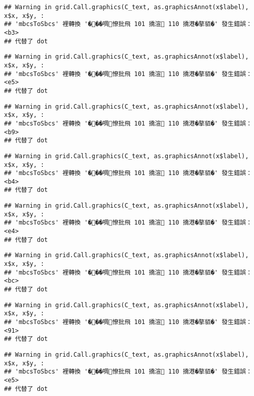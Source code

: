 \documentclass[
]{article}
\begin{document}
\begin{verbatim}
## Warning in grid.Call.graphics(C_text, as.graphicsAnnot(x$label), x$x, x$y, :
## 'mbcsToSbcs' 裡轉換 '���啁憭批飛 101 撟渲 110 撟港�摮貊�' 發生錯誤：<b3>
## 代替了 dot
\end{verbatim}

\begin{verbatim}
## Warning in grid.Call.graphics(C_text, as.graphicsAnnot(x$label), x$x, x$y, :
## 'mbcsToSbcs' 裡轉換 '���啁憭批飛 101 撟渲 110 撟港�摮貊�' 發生錯誤：<e5>
## 代替了 dot
\end{verbatim}

\begin{verbatim}
## Warning in grid.Call.graphics(C_text, as.graphicsAnnot(x$label), x$x, x$y, :
## 'mbcsToSbcs' 裡轉換 '���啁憭批飛 101 撟渲 110 撟港�摮貊�' 發生錯誤：<b9>
## 代替了 dot
\end{verbatim}

\begin{verbatim}
## Warning in grid.Call.graphics(C_text, as.graphicsAnnot(x$label), x$x, x$y, :
## 'mbcsToSbcs' 裡轉換 '���啁憭批飛 101 撟渲 110 撟港�摮貊�' 發生錯誤：<b4>
## 代替了 dot
\end{verbatim}

\begin{verbatim}
## Warning in grid.Call.graphics(C_text, as.graphicsAnnot(x$label), x$x, x$y, :
## 'mbcsToSbcs' 裡轉換 '���啁憭批飛 101 撟渲 110 撟港�摮貊�' 發生錯誤：<e4>
## 代替了 dot
\end{verbatim}

\begin{verbatim}
## Warning in grid.Call.graphics(C_text, as.graphicsAnnot(x$label), x$x, x$y, :
## 'mbcsToSbcs' 裡轉換 '���啁憭批飛 101 撟渲 110 撟港�摮貊�' 發生錯誤：<bc>
## 代替了 dot
\end{verbatim}

\begin{verbatim}
## Warning in grid.Call.graphics(C_text, as.graphicsAnnot(x$label), x$x, x$y, :
## 'mbcsToSbcs' 裡轉換 '���啁憭批飛 101 撟渲 110 撟港�摮貊�' 發生錯誤：<91>
## 代替了 dot
\end{verbatim}

\begin{verbatim}
## Warning in grid.Call.graphics(C_text, as.graphicsAnnot(x$label), x$x, x$y, :
## 'mbcsToSbcs' 裡轉換 '���啁憭批飛 101 撟渲 110 撟港�摮貊�' 發生錯誤：<e5>
## 代替了 dot
\end{verbatim}
\end{document}
